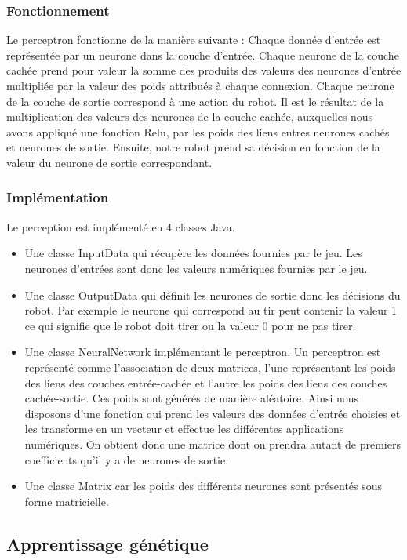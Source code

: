 \documentclass[a4paper,11pt]{article}
\begin{document}
\subsubsection{Fonctionnement}
Le perceptron fonctionne de la manière suivante :
Chaque donnée d'entrée est représentée par un neurone dans la couche d'entrée.
Chaque neurone de la couche cachée prend pour valeur la somme des produits des
valeurs des neurones d'entrée multipliée par la valeur des poids attribués à chaque
connexion.
Chaque neurone de la couche de sortie correspond à une action du robot. Il est le
résultat de la multiplication des valeurs des neurones de la couche cachée, auxquelles
nous avons appliqué une fonction Relu, par les poids des liens entres neurones cachés
et neurones de sortie.
Ensuite, notre robot prend sa décision en fonction de la valeur du neurone de sortie correspondant.

\subsubsection{Implémentation}
Le perception est implémenté en 4 classes Java.
\begin{itemize}
\item Une classe InputData qui récupère les données fournies par le jeu. Les neurones d'entrées sont donc les valeurs numériques fournies par le jeu.
\item Une classe OutputData qui définit les neurones de sortie donc les décisions du robot. Par exemple le neurone qui correspond au tir peut contenir la valeur 1 ce qui signifie que le robot doit tirer ou la valeur 0 pour ne pas tirer.
\item Une classe NeuralNetwork implémentant le perceptron. Un perceptron est représenté comme l'association de deux matrices, l'une représentant les poids des liens des couches
entrée-cachée et l'autre les poids des liens des couches cachée-sortie. Ces poids sont générés de manière aléatoire.
Ainsi nous disposons d'une fonction qui prend les valeurs des données d'entrée
choisies et les transforme en un vecteur et effectue les différentes applications
numériques. On obtient donc une matrice dont on prendra autant de premiers coefficients qu'il y a de neurones de sortie.
\item Une classe Matrix car les poids des différents neurones sont présentés sous forme matricielle.
\end{itemize}



\subsection{Apprentissage génétique}
\end{document}
